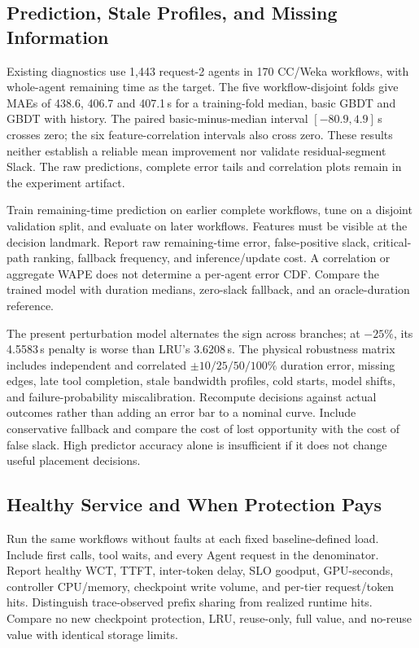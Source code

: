\documentclass[sigplan,10pt,anonymous,nonacm]{acmart}
\begin{document}
\FloatBarrier
\subsection{Prediction, Stale Profiles, and Missing Information}
\label{sec:eval-prediction}

Existing diagnostics use 1,443 request-2 agents in 170 CC/Weka workflows,
with whole-agent remaining time as the target. The five workflow-disjoint
folds give MAEs of 438.6, 406.7 and 407.1\,s for a training-fold median,
basic GBDT and GBDT with history. The paired basic-minus-median interval
$[-80.9,4.9]$\,s crosses zero; the six feature-correlation intervals also
cross zero. These results neither establish a reliable mean improvement
nor validate residual-segment Slack. The raw predictions, complete error
tails and correlation plots remain in the experiment artifact.

Train remaining-time prediction on earlier complete workflows, tune on
a disjoint validation split, and evaluate on later workflows. Features
must be visible at the decision landmark. Report raw remaining-time
error, false-positive slack, critical-path ranking, fallback frequency,
and inference/update cost. A correlation or aggregate WAPE does not
determine a per-agent error CDF. Compare the trained model with duration
medians, zero-slack fallback, and an oracle-duration reference.

The present perturbation model alternates the sign across branches;
at $-25\%$, its 4.5583\,s penalty is worse than LRU's 3.6208\,s.
The physical robustness matrix includes independent and correlated
$\pm10/25/50/100\%$ duration error, missing edges, late tool completion,
stale bandwidth profiles, cold starts, model shifts, and failure-probability
miscalibration. Recompute decisions against actual outcomes rather than
adding an error bar to a nominal curve. Include conservative fallback
and compare the cost of lost opportunity with the cost of false slack.
High predictor accuracy alone is insufficient if it does not change
useful placement decisions.

\FloatBarrier
\subsection{Healthy Service and When Protection Pays}

Run the same workflows without faults at each fixed baseline-defined
load. Include first calls, tool waits, and every Agent request in the
denominator. Report healthy WCT, TTFT, inter-token delay, SLO goodput,
GPU-seconds, controller CPU/memory, checkpoint write volume, and per-tier
request/token hits. Distinguish trace-observed prefix sharing from
realized runtime hits. Compare no new checkpoint protection, LRU,
reuse-only, full value, and no-reuse value with identical storage limits.
\end{document}
